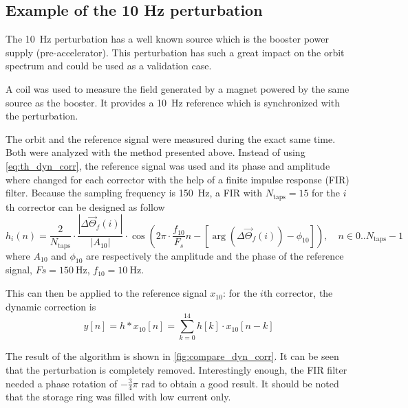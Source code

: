 \subsection{Example of the 10 Hz perturbation}
\label{sec:dyn_corr_ex_10Hz}
The \SI{10}{\hertz} perturbation has a well known source which is the booster power supply (pre-accelerator). This perturbation has such a great impact on the orbit spectrum and could be used as a validation case.

A coil was used to measure the field generated by a magnet powered by the same source as the booster. It provides a \SI{10}{\hertz} reference which is synchronized with the perturbation.

The orbit and the reference signal were measured during the exact same time. Both were analyzed with the method presented above. Instead of using \cref{eq:th_dyn_corr}, the reference signal was used and its phase and amplitude where changed for each corrector with the help of a finite impulse response (FIR) filter. Because the sampling frequency is \SI{150}{\hertz}, a FIR with $N_\text{taps} = 15$ for the $i$th corrector can be designed as follow
\begin{equation}
	h_i(n) = \frac{2}{N_\text{taps}}\cdot \frac{\left| \Delta\vec{\Theta}_f(i) \right|}{\left|A_{10}\right|} \cdot \cos\left(2\pi\cdot \frac{f_{10}}{F_s} n - \left[\arg\left(\Delta\vec{\Theta}_f(i)\right) - \phi_{10}\right] \right),\quad n \in 0..N_\text{taps}-1
\end{equation}
where $A_{10}$ and $\phi_{10}$ are respectively the amplitude and the phase of the reference signal, $Fs=\SI{150}{\hertz}$, $f_{10}=\SI{10}{\hertz}$.

This can then be applied to the reference signal $x_{10}$: for the $i$th corrector, the dynamic correction is
\begin{equation}
y[n] = h * x_{10} [n] =  \sum\limits_{k=0}^{14} h[k] \cdot x_{10}[n-k]
\end{equation}

The result of the algorithm is shown in \cref{fig:compare_dyn_corr}. It can be seen that the perturbation is completely removed. Interestingly enough, the FIR filter needed a phase rotation of $-\frac{3}{4}\pi \text{~rad}$ to obtain a good result. It should be noted that the storage ring was filled with low current only.

